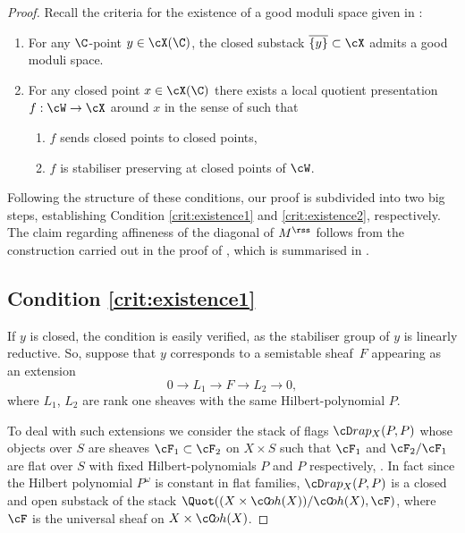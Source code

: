 \begin{proof} Recall the criteria for the existence of a good moduli space given in \cite[Th.\,1.2]{AlperFS}:
\begin{enumerate}
\item\label{crit:existence1} For any $\C$-point $y\in\cX(\C)$, the closed substack $\overline{\{y\}} \subset \cX$ admits a good moduli space.
\item\label{crit:existence2} For any closed point $x\in\cX(\C)$ there exists a local quotient presentation $f:\cW\to\cX$ around $x$ in the sense of \cite[Def.\,2.1]{AlperFS} such that
\begin{enumerate}
\item\label{crit:existence2a} $f$ sends closed points to closed points,
\item\label{crit:existence2b} $f$ is stabiliser preserving at closed points of $\cW$.
\end{enumerate}
\end{enumerate}
Following the structure of these conditions, our proof is subdivided into two big steps, establishing Condition \eqref{crit:existence1} and \eqref{crit:existence2}, respectively. The claim regarding affineness of the diagonal of $M^{{\rss}}$ follows from the construction carried out in the proof of \cite[Th.\,1.2]{AlperFS}, which is summarised in \cite[\S 1.1]{AlperFS}.
\subsection{Condition \eqref{crit:existence1}} If $y$ is closed, the condition is easily verified, as the stabiliser group of $y$ is
linearly reductive.
So, suppose that $y$ corresponds to a semistable sheaf~$F$ appearing as an extension
\[
0\to L_1\to F\to L_2\to 0,
\]
where $L_1$, $L_2$ are rank one sheaves with the same Hilbert-polynomial $P$.

To deal with such extensions we consider the stack of flags $\cD rap_X(P,P)$ whose objects over $S$ are sheaves $\cF_1\subset \cF_2$ on $X\times S$ such that $\cF_1$ and $ \cF_2/\cF_1$ are flat over $S$ with fixed Hilbert-polynomials $P$ and $P$ respectively, \cf \cite[\S 2.A.1]{HL}. In fact since the Hilbert polynomial $P^\omega$ is constant in flat families, $\cD rap_X(P,P)$ is a closed and open substack of the stack $\Quot((X\times\cC\!oh(X))/\cC\!oh(X),\cF)$, where $\cF$ is the universal sheaf on $X\times\cC\!oh(X)$.


\end{proof}
